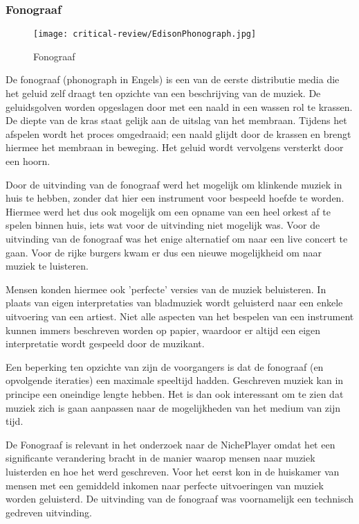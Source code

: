 \subsubsection*{Fonograaf}
\begin{wrapfigure}{r}{0.25\textwidth}
    \centering
    \texttt{[image: critical-review/EdisonPhonograph.jpg]}
    \caption{Fonograaf}
    \label{fig:critical-review:phonograph}
\end{wrapfigure}

De fonograaf (phonograph in Engels) is een van de eerste distributie media die het geluid zelf draagt ten opzichte van een beschrijving van de muziek. De geluidsgolven worden opgeslagen door met een naald in een wassen rol te krassen. De diepte van de kras staat gelijk aan de uitslag van het membraan. Tijdens het afspelen wordt het proces omgedraaid; een naald glijdt door de krassen en brengt hiermee het membraan in beweging. Het geluid wordt vervolgens versterkt door een hoorn.

Door de uitvinding van de fonograaf werd het mogelijk om klinkende muziek in huis te hebben, zonder dat hier een instrument voor bespeeld hoefde te worden. Hiermee werd het dus ook mogelijk om een opname van een heel orkest af te spelen binnen huis, iets wat voor de uitvinding niet mogelijk was. Voor de uitvinding van de fonograaf was het enige alternatief om naar een live concert te gaan. Voor de rijke burgers kwam er dus een nieuwe mogelijkheid om naar muziek te luisteren.

Mensen konden hiermee ook 'perfecte' versies van de muziek beluisteren. In plaats van eigen interpretaties van bladmuziek wordt geluisterd naar een enkele uitvoering van een artiest. Niet alle aspecten van het bespelen van een instrument kunnen immers beschreven worden op papier, waardoor er altijd een eigen interpretatie wordt gespeeld door de muzikant.

Een beperking ten opzichte van zijn de voorgangers is dat de fonograaf (en opvolgende iteraties) een maximale speeltijd hadden. Geschreven muziek kan in principe een oneindige lengte hebben. Het is dan ook interessant om te zien dat muziek zich is gaan aanpassen naar de mogelijkheden van het medium van zijn tijd.

De Fonograaf is relevant in het onderzoek naar de NichePlayer omdat het een significante verandering bracht in de manier waarop mensen naar muziek luisterden en hoe het werd geschreven. Voor het eerst kon in de huiskamer van mensen met een gemiddeld inkomen naar perfecte uitvoeringen van muziek worden geluisterd. De uitvinding van de fonograaf was voornamelijk een technisch gedreven uitvinding.

